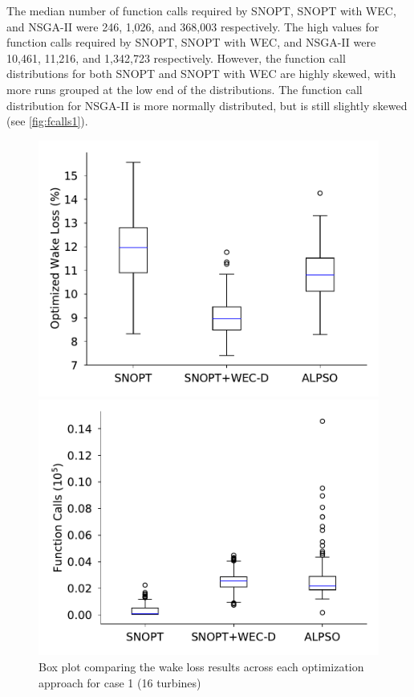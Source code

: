 \documentclass[a4paper]{jpconf}
\begin{document}
 The median number of function calls required by SNOPT, SNOPT with WEC, and NSGA-II were 246, 1,026, and 368,003 respectively. The high values for function calls required by SNOPT, SNOPT with WEC, and NSGA-II were 10,461, 11,216, and 1,342,723 respectively. However, the function call distributions for both SNOPT and SNOPT with WEC are highly skewed, with more runs grouped at the low end of the distributions. The function call distribution for NSGA-II is more normally distributed, but is still slightly skewed (see \cref{fig:fcalls1}).

\begin{figure}[h!]  
\centering
\begin{minipage}[t]{18pc}    
\centering
\includegraphics[width=\textwidth, trim={0cm 0cm 0cm 0cm}]{final_images/results/16turbs_results_alpso_percent_wake_loss.pdf}
\caption{Box plot comparing the wake loss results across each optimization approach for case 1 (16 turbines)}
\label{fig:16-wake-loss}
\end{minipage}\hspace{1pc} 
\centering
\begin{minipage}[t]{18pc}    
	\centering
	\includegraphics[width=\textwidth]{final_images/results/16turbs_results_alpso_fcalls.pdf}

\end{minipage}
\end{figure}
\end{document}
